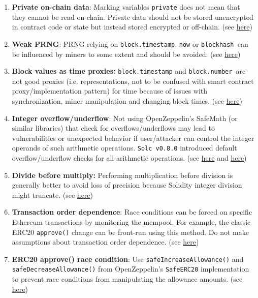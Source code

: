\begin{enumerate}
\item\textbf{Private on-chain data}: Marking variables \verb|private| does not mean that they cannot be read on-chain. Private data should not be stored unencrypted in contract code or state but instead stored encrypted or off-chain. (see \href{https://swcregistry.io/docs/SWC-136}{here})

\item\textbf{Weak PRNG}: PRNG relying on \verb|block.timestamp|, \verb|now| or \verb|blockhash |can be influenced by miners to some extent and should be avoided. (see \href{https://swcregistry.io/docs/SWC-120}{here})

\item\textbf{Block values as time proxies: }\verb|block.timestamp| and \verb|block.number |are not good proxies (i.e. representations, not to be confused with smart contract proxy/implementation pattern) for time because of issues with synchronization, miner manipulation and changing block times. (see \href{https://swcregistry.io/docs/SWC-116}{here})

\item\textbf{Integer overflow/underflow}: Not using OpenZeppelin’s SafeMath (or similar libraries) that check for overflows/underflows may lead to vulnerabilities or unexpected behavior if user/attacker can control the integer operands of such arithmetic operations. \verb|Solc v0.8.0| introduced default overflow/underflow checks for all arithmetic operations. (see \href{https://swcregistry.io/docs/SWC-101}{here} and \href{https://blog.soliditylang.org/2020/10/28/solidity-0.8.x-preview/}{here})

\item\textbf{Divide before multiply: }Performing multiplication before division is generally better to avoid loss of precision because Solidity integer division might truncate. (see \href{https://github.com/crytic/slither/wiki/Detector-Documentation\#divide-before-multiply}{here})

\item\textbf{Transaction order dependence}: Race conditions can be forced on specific Ethereum transactions by monitoring the mempool. For example, the classic ERC20 \verb|approve()| change can be front-run using this method. Do not make assumptions about transaction order dependence. (see \href{https://swcregistry.io/docs/SWC-114}{here})

\item\textbf{ERC20 approve() race condition}: Use \verb|safeIncreaseAllowance()| and \verb|safeDecreaseAllowance()| from OpenZeppelin’s \verb|SafeERC20| implementation to prevent race conditions from manipulating the allowance amounts. (see \href{https://swcregistry.io/docs/SWC-114}{here})


\end{enumerate}
